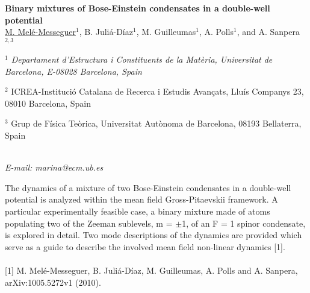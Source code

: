 \newpage
\setcounter{figure}{0}
\section*{}
\begin{center}
{\bf \Large
Binary mixtures of Bose-Einstein condensates in a double-well potential
}
\\
\vspace{0.5cm}
\underline{M. Melé-Messeguer}$^{1}$, B. Juliá-Díaz$^{1}$, M. Guilleumas$^{1}$, A. Polls$^{1}$, and A. Sanpera$^{2,3}$
\\
\vspace{0.5cm}
{\it
$^{1}$  Departament d’Estructura i Constituents de la Matèria, Universitat de Barcelona, E-08028
Barcelona, Spain

$^{2}$ ICREA-Institució Catalana de Recerca i Estudis Avançats, Lluís Companys 23, 08010
Barcelona, Spain

$^{3}$ Grup de Física Teòrica, Universitat Autònoma de Barcelona, 08193 Bellaterra, Spain
}
\\
\vspace{0.5cm}
{\it E-mail: marina@ecm.ub.es}
\\
\vspace{0.5cm}
\end{center}
The dynamics of a mixture of two Bose-Einstein condensates in a double-well potential is analyzed
within the mean field Gross-Pitaevskii framework. A particular experimentally feasible case, a
binary mixture made of atoms populating two of the Zeeman sublevels, m = $\pm$1, of an F = 1
spinor condensate, is explored in detail. Two mode descriptions of the dynamics are provided
which serve as a guide to describe the involved mean field non-linear dynamics [1].
\\
\vspace{0.5cm}
\\
{\footnotesize
[1] M. Melé-Messeguer, B. Juliá-Díaz, M. Guilleumas, A. Polls and A. Sanpera, arXiv:1005.5272v1 (2010).
}

\newpage
\setcounter{figure}{0}
